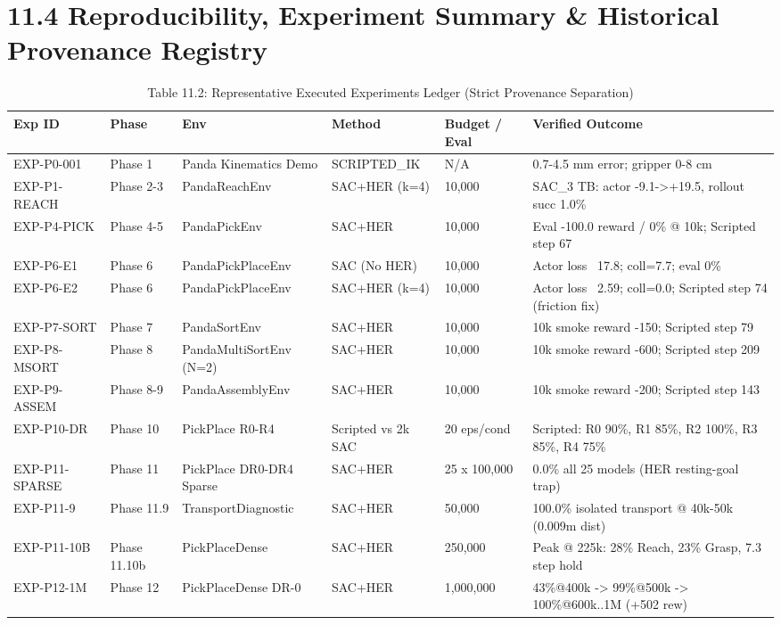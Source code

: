 \section{11.4 Reproducibility, Experiment Summary \& Historical Provenance Registry}
\begin{longtable}{l l l l l l}\caption{Table 11.2: Representative Executed Experiments Ledger (Strict Provenance Separation)}\\\toprule
Exp ID & Phase & Env & Method & Budget / Eval & Verified Outcome \\ \midrule \endhead
EXP-P0-001 & Phase 1 & Panda Kinematics Demo & SCRIPTED\_IK & N/A & 0.7-4.5 mm error; gripper 0-8 cm \\
EXP-P1-REACH & Phase 2-3 & PandaReachEnv & SAC+HER (k=4) & 10,000 & SAC\_3 TB: actor -9.1->+19.5, rollout succ 1.0\% \\
EXP-P4-PICK & Phase 4-5 & PandaPickEnv & SAC+HER & 10,000 & Eval -100.0 reward / 0\% @ 10k; Scripted step 67 \\
EXP-P6-E1 & Phase 6 & PandaPickPlaceEnv & SAC (No HER) & 10,000 & Actor loss ~17.8; coll=7.7; eval 0\% \\
EXP-P6-E2 & Phase 6 & PandaPickPlaceEnv & SAC+HER (k=4) & 10,000 & Actor loss ~2.59; coll=0.0; Scripted step 74 (friction fix) \\
EXP-P7-SORT & Phase 7 & PandaSortEnv & SAC+HER & 10,000 & 10k smoke reward -150; Scripted step 79 \\
EXP-P8-MSORT & Phase 8 & PandaMultiSortEnv (N=2) & SAC+HER & 10,000 & 10k smoke reward -600; Scripted step 209 \\
EXP-P9-ASSEM & Phase 8-9 & PandaAssemblyEnv & SAC+HER & 10,000 & 10k smoke reward -200; Scripted step 143 \\
EXP-P10-DR & Phase 10 & PickPlace R0-R4 & Scripted vs 2k SAC & 20 eps/cond & Scripted: R0 90\%, R1 85\%, R2 100\%, R3 85\%, R4 75\% \\
EXP-P11-SPARSE & Phase 11 & PickPlace DR0-DR4 Sparse & SAC+HER & 25 x 100,000 & 0.0\% all 25 models (HER resting-goal trap) \\
EXP-P11-9 & Phase 11.9 & TransportDiagnostic & SAC+HER & 50,000 & 100.0\% isolated transport @ 40k-50k (0.009m dist) \\
EXP-P11-10B & Phase 11.10b & PickPlaceDense & SAC+HER & 250,000 & Peak @ 225k: 28\% Reach, 23\% Grasp, 7.3 step hold \\
EXP-P12-1M & Phase 12 & PickPlaceDense DR-0 & SAC+HER & 1,000,000 & 43\%@400k -> 99\%@500k -> 100\%@600k..1M (+502 rew) \\

\end{longtable}
